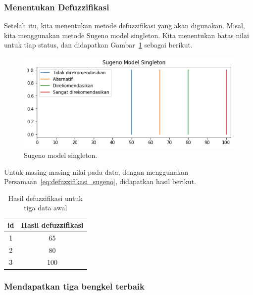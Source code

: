 \documentclass[12pt,a4paper]{article}
\theoremstyle{remark}
\begin{document}
\subsubsection*{Menentukan Defuzzifikasi}

Setelah itu, kita menentukan metode defuzzifikasi yang akan digunakan. Misal, kita menggunakan metode Sugeno model singleton. Kita menentukan batas nilai untuk tiap status, dan didapatkan Gambar~\ref{fig:model_sugeno} sebagai berikut.

\begin{figure}[H]
    \centering
    \includegraphics[width=1\linewidth]{images/hasil_sugeno.png}
    \caption{Sugeno model singleton.}
    \label{fig:model_sugeno}
\end{figure}

Untuk masing-masing nilai pada data, dengan menggunakan Persamaan~\ref{eq:defuzzifikasi_sugeno}, didapatkan hasil berikut.

\begin{table}[H]
    \centering
    \caption{Hasil defuzzifikasi untuk tiga data awal}
    \label{tab:hasil_defuzzifikasi}
    \begin{tabular}{|c|c|}
        \hline
        \textbf{id} & \textbf{Hasil defuzzifikasi} \\ \hline
        1           & 65                           \\
        2           & 80                           \\
        3           & 100                          \\
        \hline
    \end{tabular}
\end{table}

\subsubsection*{Mendapatkan tiga bengkel terbaik}
\end{document}

